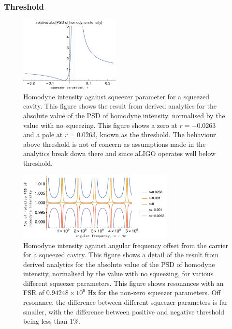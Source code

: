 \documentclass[aps,pra,superscriptaddress,reprint,nofootinbib]{revtex4-1}
\begin{document}
\subsubsection{Threshold}

\begin{figure}[ht]
	\begin{center}
	\includegraphics[width=0.45\textwidth]{figures/not_main_PSD_vs_r.pdf}
	\end{center}
	\caption{Homodyne intensity against squeezer parameter for a squeezed cavity. This figure shows the result from derived analytics for the absolute value of the PSD of homodyne intensity, normalised by the value with no squeezing. This figure shows a zero at $r = - 0.0263$ and a pole at $r = 0.0263$, known as the threshold. The behaviour above threshold is not of concern as assumptions made in the analytics break down there and since aLIGO operates well below threshold.}
	\label{fig:not_main_PSD_vs_r}
\end{figure}

\begin{figure}
	\begin{center}
	\includegraphics[width=0.7\textwidth]{figures/not_main_PSD_vs_freq.pdf}
	\end{center}
	\caption{Homodyne intensity against angular frequency offset from the carrier for a squeezed cavity. This figure shows a detail of the result from derived analytics for the absolute value of the PSD of homodyne intensity, normalised by the value with no squeezing, for various different squeezer parameters. This figure shows resonances with an FSR of $0.94248 \times 10^9$ Hz for the non-zero squeezer parameters. Off resonance, the difference between different squeezer parameters is far smaller, with the difference between positive and negative threshold being less than $1\%$.}
	\label{fig:not_main_PSD_vs_freq}
\end{figure}
\end{document}
